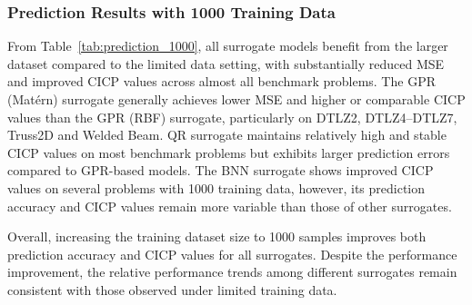 \documentclass{article}
\begin{document}
\subsubsection{Prediction Results with 1000 Training Data}
From Table~\ref{tab:prediction_1000}, all surrogate models benefit from the larger dataset compared to the limited data setting, with substantially reduced MSE and improved CICP values across almost all benchmark problems. The GPR (Mat\'ern) surrogate generally achieves lower MSE and higher or comparable CICP values than the GPR (RBF) surrogate, particularly on DTLZ2, DTLZ4–DTLZ7, Truss2D and Welded Beam. QR surrogate maintains relatively high and stable CICP values on most benchmark problems but exhibits larger prediction errors compared to GPR-based models. The BNN surrogate shows improved CICP values on several problems with 1000 training data, however, its prediction accuracy  and CICP values remain more variable than those of other surrogates.

Overall, increasing the training dataset size to 1000 samples improves both prediction accuracy and CICP values for all surrogates. Despite the performance improvement, the relative performance trends among different surrogates remain consistent with those observed under limited training data.
\end{document}
